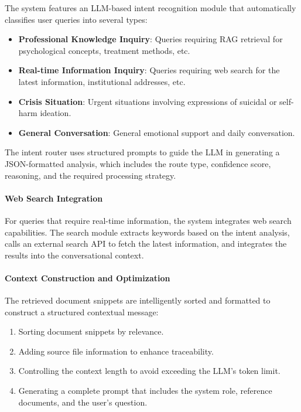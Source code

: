 The system features an LLM-based intent recognition module that automatically classifies user queries into several types:

\begin{itemize} \item \textbf{Professional Knowledge Inquiry}: Queries requiring RAG retrieval for psychological concepts, treatment methods, etc. \item \textbf{Real-time Information Inquiry}: Queries requiring web search for the latest information, institutional addresses, etc. \item \textbf{Crisis Situation}: Urgent situations involving expressions of suicidal or self-harm ideation. \item \textbf{General Conversation}: General emotional support and daily conversation. \end{itemize}

The intent router uses structured prompts to guide the LLM in generating a JSON-formatted analysis, which includes the route type, confidence score, reasoning, and the required processing strategy.

\paragraph{Web Search Integration}

For queries that require real-time information, the system integrates web search capabilities. The search module extracts keywords based on the intent analysis, calls an external search API to fetch the latest information, and integrates the results into the conversational context.

\paragraph{Context Construction and Optimization}

The retrieved document snippets are intelligently sorted and formatted to construct a structured contextual message: \begin{enumerate} \item Sorting document snippets by relevance. \item Adding source file information to enhance traceability. \item Controlling the context length to avoid exceeding the LLM's token limit. \item Generating a complete prompt that includes the system role, reference documents, and the user's question. \end{enumerate}


